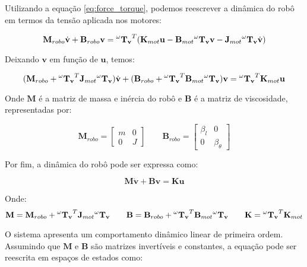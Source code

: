 Utilizando a equação \ref{eq:force_torque}, 
podemos reescrever a dinâmica do robô em 
termos da tensão aplicada nos motores:

\begin{equation}
\mathbf{M}_{robo} \dot{\mathbf{v}} + \mathbf{B}_{robo} \mathbf{v} = 
\mathbf{\prescript{\omega}{}{T_v}}^T (\mathbf{K}_{mot} \mathbf{u} - \mathbf{B}_{mot} \mathbf{\prescript{\omega}{}{T_v}} \mathbf{v} - \mathbf{J}_{mot} \mathbf{\prescript{\omega}{}{T_v}} \dot{\mathbf{v}})
\end{equation}

Deixando $\mathbf{v}$ em função de $\mathbf{u}$, temos:

\begin{equation}
(\mathbf{M}_{robo} + \mathbf{\prescript{\omega}{}{T_v}}^T \mathbf{J}_{mot} \mathbf{\prescript{\omega}{}{T_v}}) \dot{\mathbf{v}}
+
(\mathbf{B}_{robo} + \mathbf{\prescript{\omega}{}{T_v}}^T \mathbf{B}_{mot} \mathbf{\prescript{\omega}{}{T_v}}) \mathbf{v}
=
\mathbf{\prescript{\omega}{}{T_v}}^T \mathbf{K}_{mot} \mathbf{u}
\end{equation}

Onde $\mathbf{M}$ é a matriz de massa e inércia do robô e 
$\mathbf{B}$ é a matriz de viscosidade, representadas por:

\[
\mathbf{M}_{robo} =
\begin{bmatrix}
m & 0 \\
0 & J
\end{bmatrix}
\qquad
\mathbf{B}_{robo} =
\begin{bmatrix}
\beta_l & 0 \\
0 & \beta_{\theta}
\end{bmatrix}
\]

Por fim, a dinâmica do robô pode ser expressa como:

\begin{equation}
\mathbf{M} \dot{\mathbf{v}} + \mathbf{B} \mathbf{v} = \mathbf{K} \mathbf{u}
\label{eq:robot_dynamics}
\end{equation}

Onde:
\[
\mathbf{M} = \mathbf{M}_{robo} + \mathbf{\prescript{\omega}{}{T_v}}^T \mathbf{J}_{mot} \mathbf{\prescript{\omega}{}{T_v}}
\qquad
\mathbf{B} = \mathbf{B}_{robo} + \mathbf{\prescript{\omega}{}{T_v}}^T \mathbf{B}_{mot} \mathbf{\prescript{\omega}{}{T_v}}
\qquad
\mathbf{K} = \mathbf{\prescript{\omega}{}{T_v}}^T \mathbf{K}_{mot}
\]

O sistema apresenta um comportamento dinâmico linear de 
primeira ordem. Assumindo que $\mathbf{M}$ 
e $\mathbf{B}$ são matrizes invertíveis e constantes, 
a equação pode ser reescrita em espaços de estados como:

